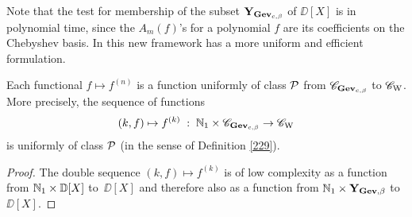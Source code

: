 Note that the test for membership of the subset ${\bf Y}_{{\bf Gev}_{c, \beta}}$  of 
$\DD[X]$ is in polynomial time, since the $A_m(f)$'s for a polynomial $f$ are its coefficients on the Chebyshev basis.
In this new framework  has a more uniform and efficient formulation.

\begin{theorem} \label{5213}
Each functional $f \mapsto f^{(n)}$ is a function uniformly of class ${\cal P}$ from ${{\mathscr C}}_{{\bf Gev}_{c, \beta}}$ to ${{{\mathscr C}}_{\rm W}}$. 
More precisely, the sequence of functions 
\[
(k,f) \mapsto f^{(k)} \; : \; \mathbb {N}_1 \times {{\mathscr C}}_{{\bf Gev}_{c, \beta}} \to {{{\mathscr C}}_{\rm W}} 
\]
is uniformly of class ${\cal P}$ (in the sense of Definition \ref{229}).
\end{theorem}

\begin{proof} 
The double sequence $(k,f) \mapsto f^{(k)}$ is of low complexity as a function from $\mathbb {N}_1 \times \mathbb {D}[X]$ to~$\DD[X]$ and therefore also as a function from $\mathbb {N}_1 \times {\bf Y}_{{\bf Gev}, \beta}$ to $\DD[X]$.


\end{proof}

